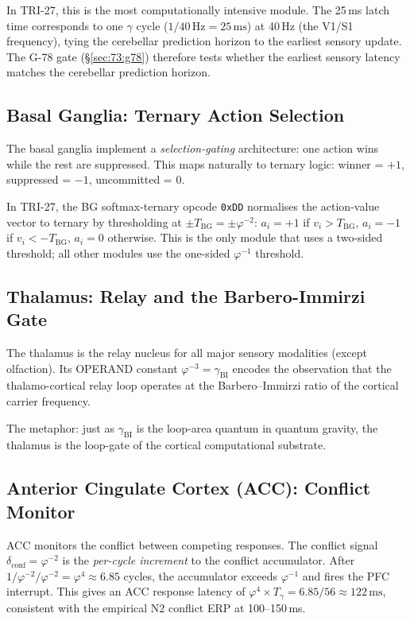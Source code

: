 In TRI-27, this is the most computationally intensive module.
The 25\,ms latch time corresponds to one $\gamma$ cycle
($1/40\,\text{Hz} = 25\,\text{ms}$) at 40\,Hz (the V1/S1
frequency), tying the cerebellar prediction horizon to the
earliest sensory update.
The G-78 gate (§\ref{sec:73:g78}) therefore tests whether
the earliest sensory latency matches the cerebellar prediction
horizon.

\subsection{Basal Ganglia: Ternary Action Selection}
\label{sec:73:ext-bg}

The basal ganglia implement a \emph{selection-gating} architecture:
one action wins while the rest are suppressed.
This maps naturally to ternary logic: winner = $+1$,
suppressed = $-1$, uncommitted = $0$.

In TRI-27, the BG softmax-ternary opcode \texttt{0xDD}
normalises the action-value vector to ternary by thresholding at
$\pm T_{\mathrm{BG}} = \pm\varphi^{-2}$:
$a_i = +1$ if $v_i > T_{\mathrm{BG}}$,
$a_i = -1$ if $v_i < -T_{\mathrm{BG}}$,
$a_i = 0$ otherwise.
This is the only module that uses a two-sided threshold;
all other modules use the one-sided $\varphi^{-1}$ threshold.

\subsection{Thalamus: Relay and the Barbero-Immirzi Gate}
\label{sec:73:ext-thl}

The thalamus is the relay nucleus for all major sensory modalities
(except olfaction).
Its OPERAND constant $\varphi^{-3} = \gamma_{\mathrm{BI}}$
encodes the observation that the thalamo-cortical relay loop
operates at the Barbero--Immirzi ratio of the cortical carrier
frequency.

The metaphor: just as $\gamma_{\mathrm{BI}}$ is the loop-area
quantum in quantum gravity, the thalamus is the loop-gate of
the cortical computational substrate.

\subsection{Anterior Cingulate Cortex (ACC): Conflict Monitor}
\label{sec:73:ext-acc}

ACC monitors the conflict between competing responses.
The conflict signal $\delta_{\mathrm{conf}} = \varphi^{-2}$
is the \emph{per-cycle increment} to the conflict accumulator.
After $1/\varphi^{-2} / \varphi^{-2} = \varphi^{4} \approx 6.85$
cycles, the accumulator exceeds $\varphi^{-1}$
and fires the PFC interrupt.
This gives an ACC response latency of
$\varphi^{4} \times T_\gamma = 6.85/56 \approx 122\,\mathrm{ms}$,
consistent with the empirical N2 conflict ERP at 100--150\,ms.

